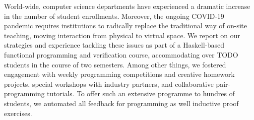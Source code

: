 World-wide, computer science departments have experienced a dramatic increase in the number of student enrollments.
Moreover, the ongoing COVID-19 pandemic requires institutions to radically replace the traditional way of on-site teaching,
moving interaction from physical to virtual space.
We report on our strategies and experience tackling these issues
as part of a Haskell-based functional programming and verification course,
accommodating  over TODO students in the course of two semesters.
Among other things,
we fostered engagement with weekly programming competitions
and creative homework projects,
special workshops with industry partners,
and collaborative pair-programming tutorials.
To offer such an extensive programme to hundres of students,
we automated all feedback for programming as well
inductive proof exercises.


